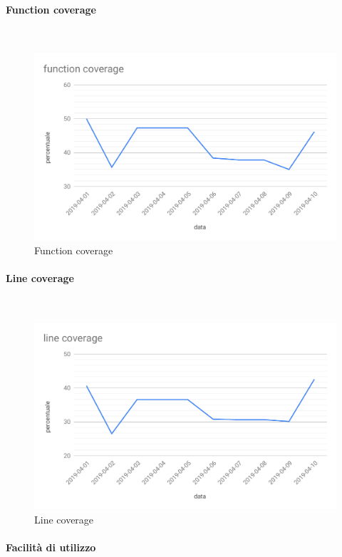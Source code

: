 \paragraph{Function coverage}\mbox{}\\
\begin{figure}[H]
	\centering
	\includegraphics[scale=0.6]{res/images/RQ/function-coverage-RQ.pdf}
	\caption{Function coverage}
\end{figure}
\paragraph{Line coverage}\mbox{}\\
\begin{figure}[H]
	\centering
	\includegraphics[scale=0.6]{res/images/RQ/line-coverage-RQ.pdf}
	\caption{Line coverage}
\end{figure}
\paragraph{Facilità di utilizzo}
